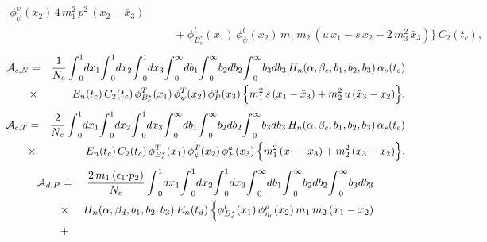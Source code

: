 \documentclass[preprint,superscriptaddress,nofootinbib]{revtex4}
\begin{document}
\begin{appendix}
\begin{eqnarray}
  {\phi}_{\psi}^{v}(x_{2})\, 4\,m_{1}^{2}\,p^{2}\,(x_{2}-\bar{x}_{3})
   \nonumber \\ & & \quad +
  {\phi}_{B_{c}^{\ast}}^{t}(x_{1})\, {\phi}_{\psi}^{t}(x_{2})\,
  m_{1}\,m_{2}\,(u\,x_{1}-s\,x_{2}-2\,m_{3}^{2}\,\bar{x}_{3})
   \Big\}\, C_{2}(t_{c})
   \label{amp:c-02},
   \end{eqnarray}
   \begin{eqnarray}
  {\cal A}_{c,N} &=&
   \frac{1}{N_{c}}\,
  {\int}_{0}^{1}dx_{1}
  {\int}_{0}^{1}dx_{2}
  {\int}_{0}^{1}dx_{3}
  {\int}_{0}^{\infty}db_{1}
  {\int}_{0}^{\infty}b_{2}db_{2}
  {\int}_{0}^{\infty}b_{3}db_{3}\,
  H_{n}({\alpha},{\beta}_{c},b_{1},b_{2},b_{3})\,
  {\alpha}_{s}(t_{c})
   \nonumber \\ &{\times}&
  E_{n}(t_{c})\, C_{2}(t_{c})\, {\phi}_{B_{c}^{\ast}}^{T}(x_{1})\,
  {\phi}_{\psi}^{T}(x_{2})\, {\phi}_{P}^{a}(x_{3})\,
  \Big\{ m_{1}^{2}\,s\,(x_{1}-\bar{x}_{3})
  + m_{2}^{2}\,u\,(\bar{x}_{3}-x_{2}) \Big\}
   \label{amp:c-03},
   \end{eqnarray}
   \begin{eqnarray}
  {\cal A}_{c,T} &=&
   \frac{2}{N_{c}}\,
  {\int}_{0}^{1}dx_{1}
  {\int}_{0}^{1}dx_{2}
  {\int}_{0}^{1}dx_{3}
  {\int}_{0}^{\infty}db_{1}
  {\int}_{0}^{\infty}b_{2}db_{2}
  {\int}_{0}^{\infty}b_{3}db_{3}\,
  H_{n}({\alpha},{\beta}_{c},b_{1},b_{2},b_{3})\,
  {\alpha}_{s}(t_{c})
   \nonumber \\ &{\times}&
  E_{n}(t_{c})\, C_{2}(t_{c})\, {\phi}_{B_{c}^{\ast}}^{T}(x_{1})\,
  {\phi}_{\psi}^{T}(x_{2})\, {\phi}_{P}^{a}(x_{3})\,
  \Big\{ m_{1}^{2}\,(x_{1}-\bar{x}_{3})
  + m_{2}^{2}\,(\bar{x}_{3}-x_{2}) \Big\}
   \label{amp:c-04},
   \end{eqnarray}
   \begin{eqnarray}
  {\cal A}_{d,P} &=&
   \frac{ 2\,m_{1}\,({\epsilon}_{1}{\cdot}p_{2}) }{ N_{c} }\,
  {\int}_{0}^{1}dx_{1}
  {\int}_{0}^{1}dx_{2}
  {\int}_{0}^{1}dx_{3}
  {\int}_{0}^{\infty}db_{1}
  {\int}_{0}^{\infty}b_{2}db_{2}
  {\int}_{0}^{\infty}b_{3}db_{3}
   \nonumber \\ &{\times}&
  H_{n}({\alpha},{\beta}_{d},b_{1},b_{2},b_{3})\,
  E_{n}(t_{d})\, \Big\{ {\phi}_{B_{c}^{\ast}}^{t}(x_{1})\,
  {\phi}_{{\eta}_{c}}^{p}(x_{2})\, m_{1}\,m_{2}\,(x_{1}-x_{2})
   \nonumber \\ &+&

\end{eqnarray}
\end{appendix}
\end{document}
